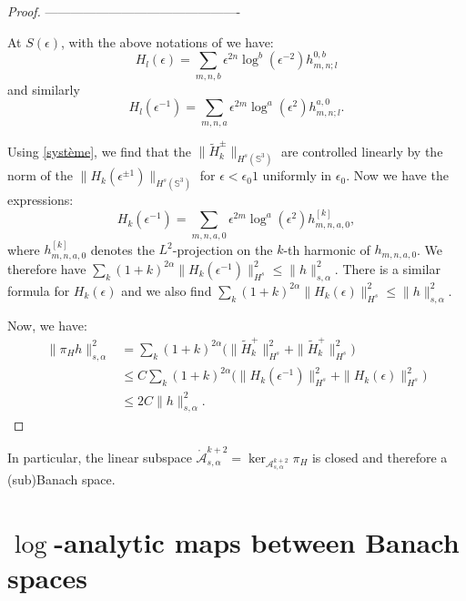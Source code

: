 \documentclass[12pt]{article}
\newcommand{\calA}{{\mathcal A}}
\begin{document}
\begin{proof}
----------------------------------------------

      At $S(\epsilon)$, with the above notations of we have: 
        \begin{equation}
            H_l(\epsilon) = \sum_{m,n,b}\epsilon ^{2n}\log^b(\epsilon^{-2}) h_{m,n;l}^{0,b}\label{Hepsilon}
        \end{equation}
        and similarly
        \begin{equation}
            H_l(\epsilon^{-1}) = \sum_{m,n,a}\epsilon^{2m}\log^a(\epsilon^{2}) h_{m,n;l}^{a,0}.\label{Hepsilon-}
        \end{equation}
        
        Using  \eqref{système}, we find that the $\|\tilde{H}_{k}^\pm\|_{H^s(\mathbb{S}^3)}$ are controlled linearly by the norm of the $\|H_k(\epsilon^{\pm 1})\|_{H^s(\mathbb{S}^3)}$ for $\epsilon < \epsilon_0 1$ uniformly in $\epsilon_0$. Now we have the expressions:
        $$ H_k(\epsilon^{-1}) = \sum_{m,n,a,0}\epsilon^{2m}\log^a(\epsilon^{2})h_{m,n,a,0}^{[k]},$$
        where $h_{m,n,a,0}^{[k]}$ denotes the $L^2$-projection on the $k$-th harmonic of $h_{m,n,a,0}$. We therefore have $\sum_k(1+k)^{2\alpha}\|H_k(\epsilon^{-1})\|^2_{H^s}\leqslant \|h\|_{s,\alpha}^2$. There is a similar formula for $H_k(\epsilon)$ and we also find $\sum_k(1+k)^{2\alpha}\|H_k(\epsilon)\|^2_{H^s}\leqslant \|h\|_{s,\alpha}^2$.
         
        Now, we have:
        \begin{align*}
            \|\pi_{H}h\|^2_{s,\alpha} &= \sum_{k}(1+k)^{2\alpha}\Big(\|\tilde{H}_{k}^+\|^2_{H^s}+\|\tilde{H}_{k}^+\|^2_{H^s}\Big)\\
            &\leqslant C \sum_{k}(1+k)^{2\alpha}\Big(\|H_k(\epsilon^{-1})\|^2_{H^s}+\|H_k(\epsilon)\|^2_{H^s}\Big)\\
            &\leqslant 2C\|h\|_{s,\alpha}^2.
        \end{align*}
\end{proof}
    
        In particular, the linear subspace $\mathring{\calA}_{s,\alpha}^{k+2} = \ker_{\calA_{s,\alpha}^{k+2}} \pi_H$ is closed and therefore a (sub)Banach space.


\section{$\log$-analytic maps between Banach spaces}
  
\end{document}
